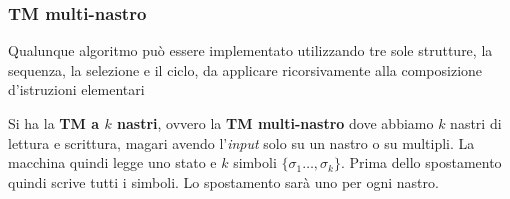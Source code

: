 \subsubsection{TM multi-nastro}
\begin{definizione}
  Qualunque algoritmo può essere implementato utilizzando tre sole strutture, la
  sequenza, la selezione e il ciclo, da applicare ricorsivamente alla
  composizione d'istruzioni elementari
\end{definizione}
\begin{definizione}
  Si ha la \textbf{TM a $k$ nastri}, ovvero la \textbf{TM
    multi-nastro} dove abbiamo $k$ nastri di lettura e scrittura, magari avendo
  l'\textit{input} solo su un nastro o su multipli. La macchina quindi legge uno stato e
  $k$ simboli $\{\sigma_1\ldots,\sigma_k\}$. Prima dello spostamento quindi
  scrive tutti i simboli. Lo spostamento sarà uno per ogni nastro.
\end{definizione}
